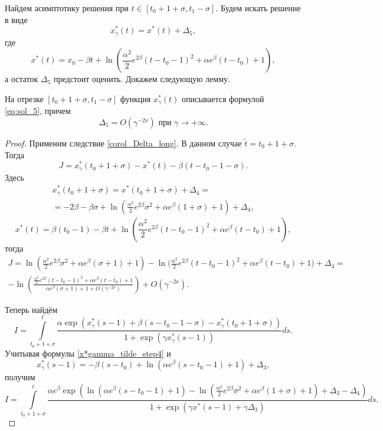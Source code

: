 Найдем асимптотику решения при $t \in [t_0 + 1 + \sigma, t_1 - \sigma]$. Будем искать решение в виде
\begin{equation}
	\label{eq:sol_5}
	x_\gamma^*(t) = x^*(t) + \Delta_5,
\end{equation}
%
где 
\[x^*(t) = x_0 - \beta t + \ln\left(\frac{\alpha^2}{2} e^{2\beta} (t - t_0 - 1)^2 + \alpha e^{\beta}(t - t_0) + 1 \right),\]
а остаток $\Delta_5$ предстоит оценить. Докажем следующую лемму.
%
\begin{lemma}
\label{lem_Delta5}
На отрезке $[t_0 + 1 + \sigma, t_1 - \sigma]$ функция $x_\gamma^*(t)$ описывается формулой \eqref{eq:sol_5}, причем
\[
\Delta_5 = O(\gamma^{-2\nu}) \text{ при } \gamma \to +\infty.
\]
\end{lemma}
\begin{proof}
%
Применим следствие \ref{corol_Delta_long}. В данном случае $\tilde{t} = t_0 + 1 + \sigma$.
Тогда
%
\[
J = x_\gamma^*(t_0+1+\sigma) - x^*(t) - \beta(t - t_0 - 1 - \sigma).
\]
%
Здесь
\begin{multline}
	\label{x*gamma_tilde_step4}
	x_\gamma^*(t_0 + 1 + \sigma) = x^*(t_0 + 1 + \sigma) + \Delta_4 = \\
	= -2 \beta - \beta \sigma + \ln\left(\frac{\alpha^2}{2} e^{2\beta} \sigma^2 + \alpha e^{\beta} (1 + \sigma) + 1 \right) + \Delta_4,
\end{multline}
%
\[
x^*(t) = \beta(t_0 - 1) - \beta t + \ln\left(\frac{\alpha^2}{2} e^{2\beta}(t - t_0 - 1)^2 + \alpha e^{\beta}(t - t_0) + 1\right),
\]
%
тогда
\begin{multline}
	\label{J_step5}
	J = \ln\left(\frac{\alpha^2}{2}e^{2\beta}\sigma^2 + \alpha e^{\beta}(\sigma + 1) + 1 \right) - \ln\Big(\frac{\alpha^2}{2}e^{2\beta}(t - t_0 - 1)^2+\alpha e^{\beta}(t - t_0) + 1 \Big) + \Delta_4=
	\\
	-\ln\left(\frac{\frac{\alpha^2}{2}e^{2\beta}(t - t_0 - 1)^2+\alpha e^{\beta}(t - t_0) + 1}{\alpha e^{\beta}(\sigma + 1) + 1 + O(\gamma^{-2\nu})}\right) + O(\gamma^{-2\nu}).
\end{multline}

Теперь найдём
\begin{equation*}
	I = \int\limits_{t_0 + 1 + \sigma}^{t} \frac{\alpha \exp(x_\gamma^*(s - 1) + \beta(s - t_0 - 1 - \sigma) - x_\gamma^*(t_0 + 1 + \sigma))}{1 + \exp(\gamma x_\gamma^*(s - 1))}ds.
\end{equation*}
Учитывая формулы \eqref{x*gamma_tilde_step4} и
%
\[
x_\gamma^*(s-1) = -\beta (s - t_0) + \ln(\alpha e^{\beta}(s - t_0 - 1) + 1) + \Delta_3,
\]
%
получим
%
\small
\begin{equation*}
	I = \int\limits_{t_0 + 1 + \sigma}^{t}\frac{\alpha e^\beta \exp\left( \ln(\alpha e^{\beta}(s - t_0 - 1) + 1) - \ln(\frac{\alpha^2}{2} e^{2\beta} \sigma^2 + \alpha e^{\beta}(1 + \sigma) + 1) + \Delta_3 - \Delta_4 \right)}{1 + \exp\left(\gamma x^*(s-1)  +\gamma\Delta_3\right)} ds.
\end{equation*}
\normalsize

	
	
\end{proof}






